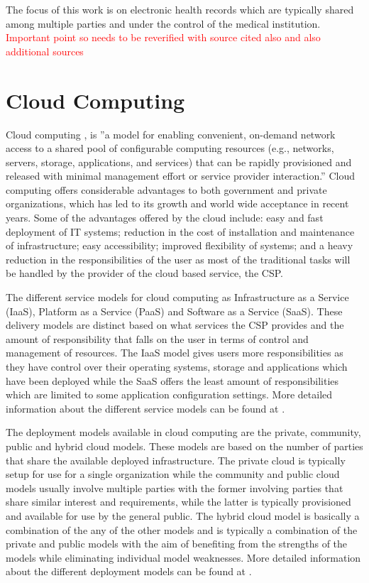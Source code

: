 The focus of this work is on electronic health records which are typically shared among multiple parties and under the control of the medical institution. \textcolor{red}{Important point so needs to be reverified with source cited also and also additional sources}

\section{Cloud Computing}

Cloud computing \cite{nist}, is ''a model for enabling convenient, on-demand network access to a shared pool of configurable computing resources (e.g., networks, servers, storage, applications, and services) that can be rapidly provisioned and released with minimal management effort or service provider interaction.'' Cloud computing offers considerable advantages to both government and private organizations, which has led to its growth and world wide acceptance in recent years. Some of the advantages offered by the cloud include: easy and fast deployment of IT systems; reduction in the cost of installation and maintenance of infrastructure; easy accessibility; improved flexibility of systems; and a heavy reduction in the responsibilities of the user as most of the traditional tasks will be handled by the provider of the cloud based service, the CSP.

The different service models for cloud computing as Infrastructure as a Service (IaaS), Platform as a Service (PaaS) and Software as a Service (SaaS). These delivery models are distinct based on what services the CSP provides and the amount of responsibility that falls on the user in terms of control and management of resources. The IaaS model gives users more responsibilities as they have control over their operating systems, storage and applications which have been deployed while the SaaS offers the least amount of responsibilities which are limited to some application configuration settings. More detailed information about the different service models can be found at \cite{nist}.

The deployment models available in cloud computing are the private, community, public and hybrid cloud models. These models are based on the number of parties that share the available deployed infrastructure. The private cloud is typically setup for use for a single organization while the community and public cloud models usually involve multiple parties with the former involving parties that share similar interest and requirements, while the latter is typically provisioned and available for use by the general public. The hybrid cloud model is basically a combination of the any of the other models and is typically a combination of the private and public models with the aim of benefiting from the strengths of the models while eliminating individual model weaknesses. More detailed information about the different deployment models can be found at \cite{nist}.

